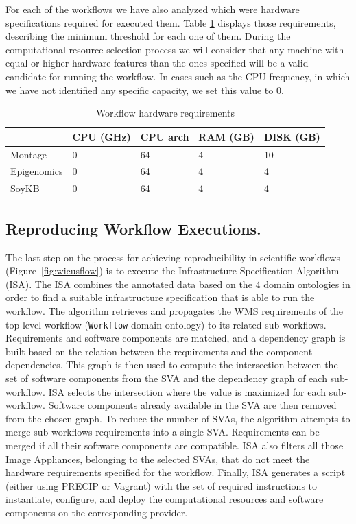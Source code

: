 For each of the workflows we have also analyzed which were hardware specifications required for executed them. Table \ref{tab:hwreqs} displays those requirements, describing the minimum threshold for each one of them. During the computational resource selection process we will consider that any machine with equal or higher hardware features than the ones specified will be a valid candidate for running the workflow. In cases such as the CPU frequency, in which we have not identified any specific capacity, we set this value to 0.



\begin{table}[h]
\begin{tabular}{l|llll}
\multicolumn{1}{c|}{} 
 & CPU (GHz) & CPU arch & RAM (GB) & DISK (GB) \\ \hline
Montage &  0 &  64 & 4 & 10 \\ \hline
Epigenomics &  0 &  64 &  4 & 4  \\ \hline
SoyKB & 0  & 64 & 4 & 4  \\ \hline
\end{tabular}
\caption{Workflow hardware requirements}
\label{tab:hwreqs}
\end{table}


\subsection{Reproducing Workflow Executions.}

The last step on the process for achieving reproducibility in scientific workflows (Figure~\ref{fig:wicusflow}) is to execute the Infrastructure Specification Algorithm (ISA). The ISA combines the annotated data based on the 4 domain ontologies in order to find a suitable infrastructure specification that is able to run the workflow. The algorithm retrieves and propagates the WMS requirements of the top-level workflow (\texttt{Workflow} domain ontology) to its related sub-workflows. Requirements and software components are matched, and a dependency graph is built based on the relation between the requirements and the component dependencies. This graph is then used to compute the intersection between the set of software components from the SVA and the dependency graph of each sub-workflow. ISA selects the intersection where the value is maximized for each sub-workflow. Software components already available in the SVA are then removed from the chosen graph. To reduce the number of SVAs, the algorithm attempts to merge sub-workflows requirements into a single SVA. Requirements can be merged if all their software components are compatible. ISA also filters all those Image Appliances, belonging to the selected SVAs, that do not meet the hardware requirements specified for the workflow. Finally, ISA generates a script (either using PRECIP or Vagrant) with the set of required instructions to instantiate, configure, and deploy the computational resources and software components on the corresponding provider.


